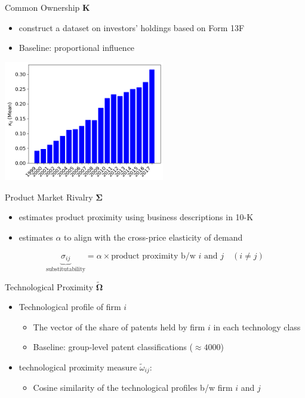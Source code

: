 \documentclass[
  10pt,               %
  aspectratio=169,    %
  handout             %
]{beamer}
\theoremstyle{plain}
\begin{document}
\begin{frame}{Common Ownership $\bm{K}$}
  \begin{itemize}
    \item \citet{Backus2021-yt} construct a dataset on investors' holdings based on Form 13F
    \item Baseline: \citet{Rotemberg1984-jz} proportional influence \hfill\hyperlink{rotemberg}{}
  \end{itemize}
  \begin{center}
    \includegraphics[width=7cm]{figures/kappa}
  \end{center}
\end{frame}
%
\begin{frame}{Product Market Rivalry $\bm{\Sigma}$} 

  \begin{itemize}
    \item \label{product_identification} \citet{Hoberg2016-jm} estimates product proximity using business
          descriptions in 10-K
          \medskip{}
    \item \citet{Pellegrino2024-dn} estimates $\alpha$ to align with the cross-price
          elasticity of demand \hyperlink{micro_vs_ghl}{}
  \end{itemize}
  \medskip{}
  \[
    \underbrace{\sigma_{ij}}_{\text{substitutability}}=\alpha\times\text{product proximity b/w }i\text{ and }j\quad\left(i\neq j\right)
  \]

\end{frame}
%
\begin{frame}{Technological Proximity $\widetilde{\bm{\Omega}}$}
  \begin{itemize}
    \item Technological profile of firm $i$
          \begin{itemize}
            \item The vector of the share of patents held by firm
            $i$ in each technology class
            \item Baseline: group-level patent classifications ($\approx4000$)\medskip{}
          \end{itemize}
          \medskip{}
    \item \citet{Jaffe1986-yz} technological proximity measure $\tilde{\omega}_{ij}$:
      \begin{itemize}
      \item Cosine similarity of the technological profiles b/w firm $i$ and $j$
      \end{itemize}
  \end{itemize}
\end{frame}
\end{document}
